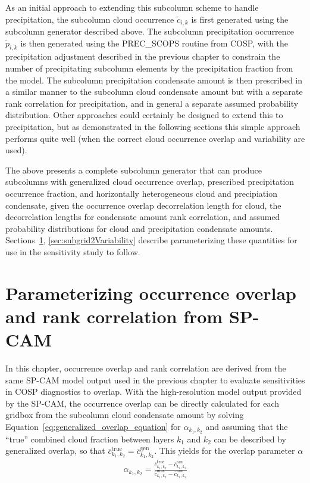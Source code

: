 As an initial approach to extending this subcolumn scheme to handle
precipitation, the subcolumn cloud occurrence \(\tilde{c}_{i, k}\) is
first generated using the subcolumn generator described above. The
subcolumn precipitation occurrence \(\tilde{p}_{i, k}\) is then
generated using the PREC\_SCOPS routine from COSP, with the
precipitation adjustment described in the previous chapter to constrain
the number of precipitating subcolumn elements by the precipitation
fraction from the model. The subcolumn precipitation condensate amount
is then prescribed in a similar manner to the subcolumn cloud condensate
amount but with a separate rank correlation for precipitation, and in
general a separate assumed probability distribution. Other approaches
could certainly be designed to extend this to precipitation, but as
demonstrated in the following sections this simple approach performs
quite well (when the correct cloud occurrence overlap and variability
are used).

The above presents a complete subcolumn generator that can produce
subcolumns with generalized cloud occurrence overlap, prescribed
precipitation occurrence fraction, and horizontally heterogeneous cloud
and precipiation condensate, given the occurrence overlap decorrelation
length for cloud, the decorrelation lengths for condensate amount rank
correlation, and assumed probability distributions for cloud and
precipitation condensate amounts.
Sections~\ref{sec:subgrid2Overlap}, \ref{sec:subgrid2Variability}
describe parameterizing these quantities for use in the sensitivity
study to follow.

\section{Parameterizing occurrence overlap and rank correlation from
SP-CAM}\label{sec:subgrid2Overlap}

In this chapter, occurrence overlap and rank correlation are derived
from the same SP-CAM model output used in the previous chapter to
evaluate sensitivities in COSP diagnostics to overlap. With the
high-resolution model output provided by the SP-CAM, the occurrence
overlap can be directly calculated for each gridbox from the subcolumn
cloud condensate amount by solving
Equation~\ref{eq:generalized_overlap_equation} for \(\alpha_{k_1, k_2}\)
and assuming that the ``true'' combined cloud fraction between layers
\(k_1\) and \(k_2\) can be described by generalized overlap, so that
\(\overline{c}^\textrm{true}_{k_1, k_2} = \overline{c}^\textrm{gen}_{k_1, k_2}\).
This yields for the overlap parameter \(\alpha\)
\begin{equation}\begin{gathered} 
    \alpha_{k_1, k_2} = \frac{
        \overline{c}^\textrm{true}_{k_1, k_2} 
            - \overline{c}^\textrm{ran}_{k_1, k_2} 
    }{
        \overline{c}^\textrm{max}_{k_1, k_2} 
            - \overline{c}^\textrm{ran}_{k_1, k_2} 
    }
\end{gathered}\label{eq:alphaEquation}\end{equation}

